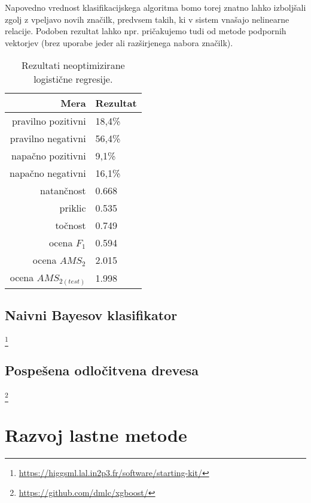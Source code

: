 \documentclass[11pt,a4paper,openany]{book}
\begin{document}
Napovedno vrednost klasifikacijskega algoritma bomo torej znatno lahko izboljšali zgolj z vpeljavo novih značilk, predvsem takih, ki v sistem vnašajo nelinearne relacije. Podoben rezultat lahko npr. pričakujemo tudi od metode podpornih vektorjev (brez uporabe jeder ali razširjenega nabora značilk).

\begin{table}[h!]
	\centering
	\begin{tabular}{rl}
		\hline
		\textbf{Mera} & \textbf{Rezultat} \\
		\hline
		pravilno pozitivni & 18,4\%\\
		pravilno negativni & 56,4\% \\
		napačno pozitivni & 9,1\% \\
		napačno negativni & 16,1\% \\
		natančnost & 0.668 \\
		priklic & 0.535 \\
		točnost & 0.749 \\
		ocena $F_1$ & 0.594 \\
		ocena $AMS_2$ & 2.015 \\
		ocena $AMS_{2(test)}$ & 1.998 		
	\end{tabular}
	\caption{Rezultati neoptimizirane logistične regresije.}
	\label{tb:logisticna}
\end{table}


\section{Naivni Bayesov klasifikator}

\footnote{\url{https://higgsml.lal.in2p3.fr/software/starting-kit/}}

\section{Pospešena odločitvena drevesa}

\footnote{\url{https://github.com/dmlc/xgboost/}}

	
\chapter{Razvoj lastne metode}
\label{ch:razvoj_lastne_metode}
\end{document}
